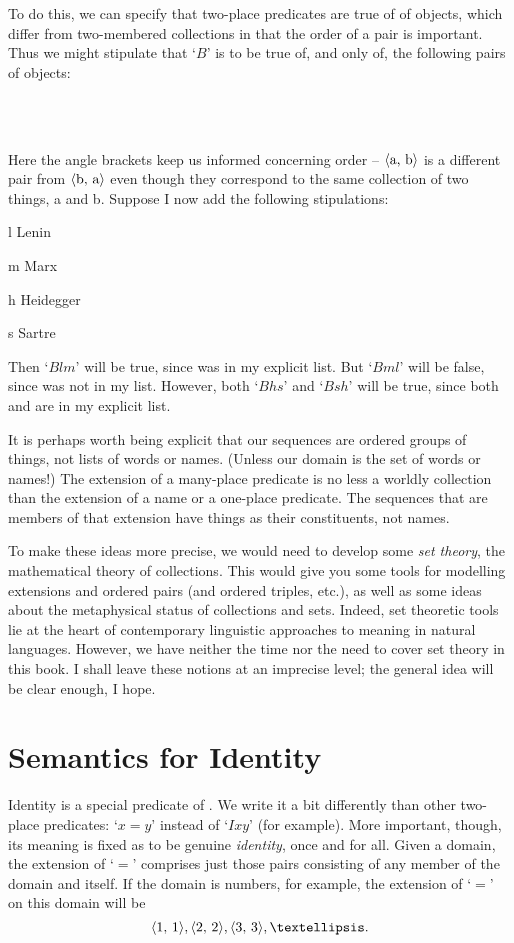To do this, we can specify that two-place predicates are true of  of objects, which differ from two-membered collections in that the order of a pair is important. Thus we might stipulate that `$B$' is to be true of, and only of, the following pairs of objects:
	\begin{center}
		\\
		\\
	\end{center}
Here the angle brackets keep us informed concerning order – $\mbox{\ensuremath{\mathopen{\langle}}a, b\ensuremath{\mathclose{\rangle}}}$ is a different pair from $\mbox{\ensuremath{\mathopen{\langle}}b, a\ensuremath{\mathclose{\rangle}}}$ even though they correspond to the same collection of two things, a and b. Suppose I now add the following stipulations:
	\begin{ekey}
		\item[l] Lenin
		\item[m] Marx
		\item[h] Heidegger
		\item[s] Sartre
	\end{ekey}
Then `$Blm$' will be true, since  was in my explicit list. But `$Bml$' will be false, since  was not in my list. However, both `$Bhs$' and `$Bsh$' will be true, since both  and  are in my explicit list. 

It is perhaps worth being explicit that our sequences are ordered groups of things, not lists of words or names. (Unless our domain is the set of words or names!) The extension of a many-place predicate is no less a worldly collection than the extension of a name or a one-place predicate. The sequences that are members of that extension have things as their constituents, not names.

To make these ideas more precise, we would need to develop some \emph{set theory}, the mathematical theory of collections. This would give you some tools for modelling extensions and ordered pairs (and ordered triples, etc.), as well as some ideas about the metaphysical status of collections and sets. Indeed, set theoretic tools lie at the heart of contemporary linguistic approaches to meaning in natural languages. However, we have neither the time nor the need to cover set theory in this book. I shall leave these notions at an imprecise level; the general idea will be clear enough, I hope. 

\section{Semantics for Identity}
Identity is a special predicate of \FOL. We write it a bit differently than other two-place predicates: `$x=y$' instead of `$Ixy$' (for example). More important, though, its meaning is fixed as to be genuine \emph{identity}, once and for all. Given a domain, the extension of `$=$' comprises just those pairs consisting of any member of the domain and itself. If the domain is numbers, for example, the extension of `$=$' on this domain will be $$\ntuple{1, 1}, \ntuple{2, 2}, \ntuple{3, 3},….$$ 

